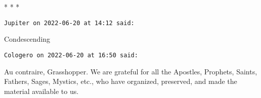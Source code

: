 \hfill


\begin{center}* * *\end{center}

\begin{footnotesize}\begin{sffamily}



\texttt{Jupiter on 2022-06-20 at 14:12 said: }

Condescending


\hfill

\texttt{Cologero on 2022-06-20 at 16:50 said: }

Au contraire, Grasshopper. We are grateful for all the Apostles, Prophets, Saints, Fathers, Sages, Mystics, etc., who have organized, preserved, and made the material available to us.


\end{sffamily}\end{footnotesize}
